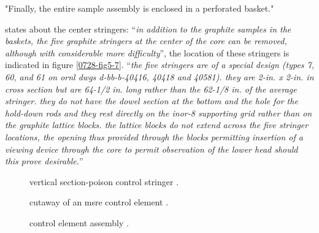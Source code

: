 \documentclass[ms,a4paper]{memoir}
\newcommand*{\mrsarchive}{../../msr-archive}%
\begin{document}
"Finally, the entire sample assembly is enclosed in a perforated basket."

\parencite[page 84]{ornl-tm-0728} states about the center stringers:
\enquote{\textit{in addition to the graphite samples in the baskets, the five graphite stringers at the center of the core can be removed, although with considerable more difficulty}}, the location of these stringers is indicated in figure \ref{0728-fig5-7}.
\enquote{\textit{the five stringers are of a special design (types 7, 60, and 61 on ornl dwgs d-bb-b-40416, 40418 and 40581). they are 2-in. x 2-in. in cross section but are 64-1/2 in. long rather than the 62-1/8 in. of the average stringer. they do not have the dowel section at the bottom and the hole for the hold-down rods and they rest directly on the inor-8 supporting grid rather than on the graphite lattice blocks. the lattice blocks do not extend across the five stringer locations, the opening thus provided through the blocks permitting insertion of a viewing device through the core to permit observation of the lower head should this prove desirable.}}

\begin{figure}[H]
  \centering
  \caption{vertical section-poison control stringer \parencite[figure 14b]{ad-cf-61-2-46}.}
  \label{61246-fig14b}
\end{figure}

\begin{figure}[H]
  \centering
  \caption{cutaway of an msre control element \parencite[figure 1]{ornl-4123}.}
  \label{4123-fig1}
\end{figure}

\begin{figure}[H]
  \centering
  \caption{control element assembly \parencite[figure B-1 to B-4]{ornl-4123}.}
  \label{4123-fig1}
\end{figure}
\end{document}
